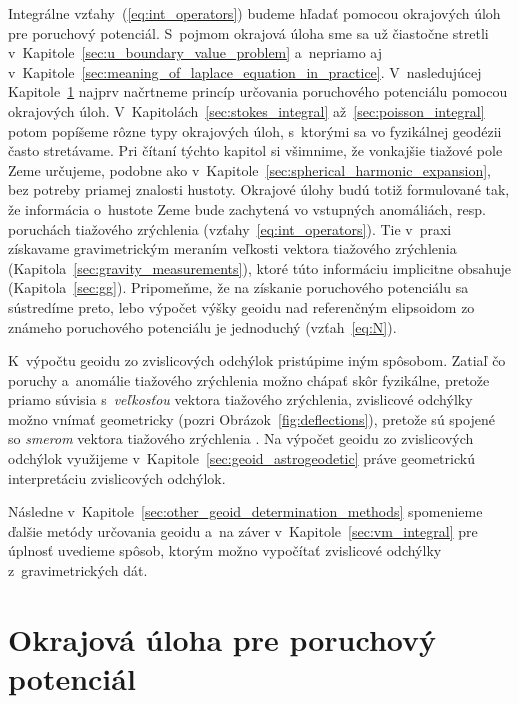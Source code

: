 \documentclass[a4paper, 12pt]{book}
\begin{document}
Integrálne vzťahy~(\ref{eq:int_operators}) budeme hľadať pomocou okrajových 
úloh pre poruchový potenciál.  S~pojmom okrajová úloha sme sa už čiastočne 
stretli v~Kapitole~\ref{sec:u_boundary_value_problem} a~nepriamo aj 
v~Kapitole~\ref{sec:meaning_of_laplace_equation_in_practice}.  V~nasledujúcej 
Kapitole~\ref{sec:boundary_value_problem} najprv načrtneme princíp určovania 
poruchového potenciálu pomocou okrajových úloh.  
V~Kapitolách~\ref{sec:stokes_integral} až~\ref{sec:poisson_integral} potom 
popíšeme rôzne typy okrajových úloh, s~ktorými sa vo fyzikálnej geodézii často 
stretávame.  Pri čítaní týchto kapitol si všimnime, že vonkajšie tiažové pole 
Zeme určujeme, podobne ako v~Kapitole~\ref{sec:spherical_harmonic_expansion}, 
bez potreby priamej znalosti hustoty.  Okrajové úlohy budú totiž formulované 
tak, že informácia o~hustote Zeme bude zachytená vo vstupných anomáliách, 
resp. poruchách tiažového zrýchlenia (vzťahy~\ref{eq:int_operators}).  Tie 
v~praxi získavame gravimetrickým meraním veľkosti vektora tiažového zrýchlenia 
(Kapitola~\ref{sec:gravity_measurements}), ktoré túto informáciu implicitne 
obsahuje (Kapitola~\ref{sec:gg}).  Pripomeňme, že na získanie poruchového 
potenciálu sa sústredíme preto, lebo výpočet výšky geoidu nad referenčným 
elipsoidom zo známeho poruchového potenciálu je jednoduchý (vzťah~\ref{eq:N}).

K~výpočtu geoidu zo zvislicových odchýlok pristúpime iným spôsobom.  Zatiaľ čo 
poruchy a~anomálie tiažového zrýchlenia možno chápať skôr fyzikálne, pretože 
priamo súvisia s~\emph{veľkosťou} vektora tiažového zrýchlenia, zvislicové 
odchýlky možno vnímať geometricky (pozri Obrázok~\ref{fig:deflections}), 
pretože sú spojené so \emph{smerom} vektora tiažového zrýchlenia 
\parencite{MoritzPhysicalGeodesy}.  Na výpočet geoidu zo zvislicových odchýlok 
využijeme v~Kapitole~\ref{sec:geoid_astrogeodetic} práve geometrickú 
interpretáciu zvislicových odchýlok.

Následne v~Kapitole~\ref{sec:other_geoid_determination_methods} spomenieme 
ďalšie metódy určovania geoidu a~na záver v~Kapitole~\ref{sec:vm_integral} pre 
úplnosť uvedieme spôsob, ktorým možno vypočítať zvislicové odchýlky 
z~gravimetrických dát.


\section{Okrajová úloha pre poruchový potenciál}
\label{sec:boundary_value_problem}
\end{document}

